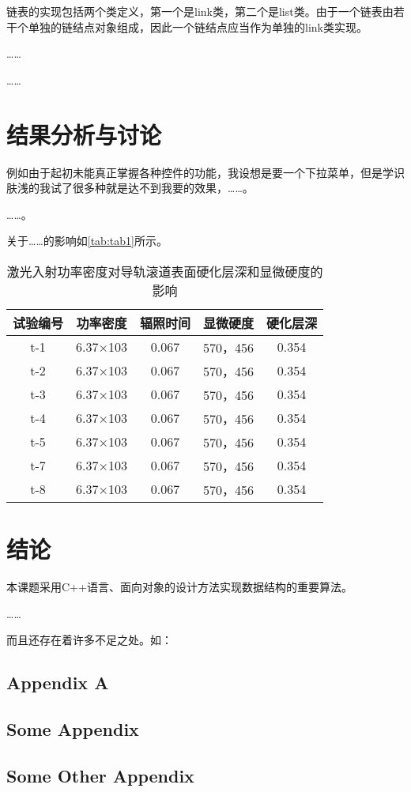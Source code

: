 \documentclass{upcthesis}
\begin{document}
链表的实现包括两个类定义，第一个是link类，第二个是list类。由于一个链表由若干个单独的链结点对象组成，因此一个链结点应当作为单独的link类实现。

……

……

\section{结果分析与讨论}
例如由于起初未能真正掌握各种控件的功能，我设想是要一个下拉菜单，但是学识肤浅的我试了很多种就是达不到我要的效果，……。

……。

关于……的影响如\autoref{tab:tab1}所示。

\begin{table}[htbp]
	\centering
	\caption{激光入射功率密度对导轨滚道表面硬化层深和显微硬度的影响}
	\begin{tabular}{ccccc}
		\toprule
		试验编号 	& 功率密度 & 辐照时间 & 显微硬度 	& 硬化层深 \\ \midrule
		t-1			&	6.37×103&	0.067	&	570，456	& 	0.354\\
		t-2			&	6.37×103&	0.067 &	570，456 &	0.354\\
		t-3			&	6.37×103&	0.067 &	570，456 &	0.354\\
		t-4			&	6.37×103&	0.067 &	570，456 &	0.354\\
		t-5			&	6.37×103&	0.067 &	570，456 &	0.354\\
		t-7			&	6.37×103&	0.067 &	570，456 &	0.354\\
		t-8			&	6.37×103&	0.067 &	570，456 &	0.354\\ \bottomrule
	\end{tabular}
	\label{tab:tab1}
\end{table} 

\section{结论}
	本课题采用C++语言、面向对象的设计方法实现数据结构的重要算法。
	
	……

	而且还存在着许多不足之处。如：

\begin{thankpage}
	\lipsum[10]
\end{thankpage}

\begin{appendices}
	\section{Appendix A}
	\subsection{Some Appendix}
	\subsection{Some Other Appendix}
\end{appendices}
\end{document}
